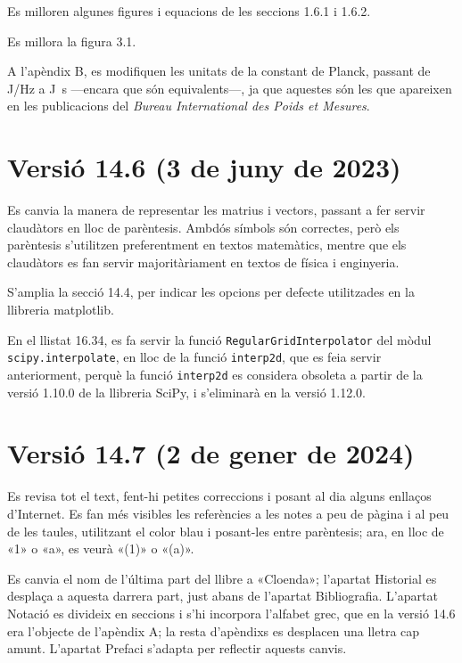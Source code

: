 Es milloren algunes figures i equacions de les seccions 1.6.1 i 1.6.2.

Es millora la figura 3.1.

A l'apèndix B, es modifiquen les unitats de la constant de Planck, passant de \unit{J/Hz} a \unit{J.s} ---encara que són equivalents---, ja que aquestes són les que apareixen en les publicacions  del \textit{Bureau 	International des Poids et Mesures}.


\section*{Versió 14.6 (3 de juny de 2023)}

Es canvia la manera de representar les matrius i vectors, passant a fer servir claudàtors en lloc de parèntesis. Ambdós símbols són correctes, però els parèntesis s'utilitzen preferentment en textos matemàtics, mentre que els claudàtors es fan servir majoritàriament en textos de física i enginyeria.

S'amplia la secció 14.4, per indicar les opcions per defecte utilitzades en la llibreria matplotlib.

En el llistat 16.34, es fa servir la funció \texttt{RegularGridInterpolator} del mòdul \texttt{scipy.interpolate}, en lloc de la funció \texttt{interp2d}, que es feia servir anteriorment, perquè la funció \texttt{interp2d} es considera obsoleta a partir de la versió 1.10.0 de la llibreria SciPy, i s'eliminarà en la versió 1.12.0.


\section*{Versió 14.7 (2 de gener de 2024)}

Es revisa tot el text, fent-hi petites correccions i posant al dia alguns enllaços d'Internet. Es fan més visibles les referències a les notes a peu de pàgina i al peu de les taules, utilitzant el color blau i posant-les entre parèntesis; ara, en lloc de {\footnotesize«1»} o {\footnotesize«a»}, es veurà {\footnotesize\color{blue}«(1)»} o {\footnotesize\color{blue}«(a)»}.

Es canvia el nom de l'última part del llibre a «Cloenda»; l'apartat Historial es desplaça a aquesta darrera part, just abans de l'apartat Bibliografia. L'apartat Notació es divideix en seccions i s'hi incorpora l'alfabet grec, que en la versió 14.6 era l'objecte de l'apèndix A; la resta d'apèndixs es desplacen una lletra cap amunt. L'apartat Prefaci s'adapta per reflectir aquests canvis.

